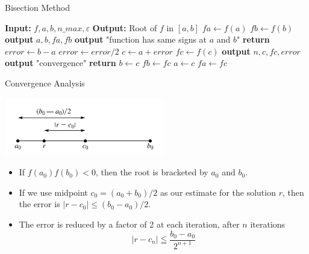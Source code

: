 \documentclass{beamer}
\begin{document}
\begin{frame}[fragile]{Bisection Method}
  \begin{multicols}{2}
  \scriptsize
    \begin{algorithmic}
      \State \textbf{Input:} $f, a, b, n\_max, \varepsilon$
      \State \textbf{Output:} Root of $f$ in $[a, b]$
      \State $fa \gets f(a)$
      \State $fb \gets f(b)$
        \State \textbf{output} $a, b, fa, fb$
        \State \textbf{output} "function has same signs at $a$ and $b$"
        \State \textbf{return}
      \EndIf
      \State $error \gets b - a$
        \State $error \gets error / 2$
        \State $c \gets a + error$
        \State $fc \gets f(c)$
        \State \textbf{output} $n, c, fc, error$
          \State \textbf{output} "convergence"
          \State \textbf{return}
        \EndIf
          \State $b \gets c$
          \State $fb \gets fc$
        \Else
          \State $a \gets c$
          \State $fa \gets fc$
        \EndIf
      \EndFor
    \EndProcedure
    \end{algorithmic}
  \end{multicols}
\end{frame}
\begin{frame}{Convergence Analysis}
  \centerline{ \includegraphics[height=1in]{Lec11_fig4.pdf}}
  \begin{itemize}
  \item If $f(a_0) f(b_0)<0$, then the root is bracketed by $a_0$ and $b_0$.
  \item If we use midpoint $c_0=(a_0+b_0)/2$ as our estimate for the solution $r$, then the error is $|r-c_0| \leq (b_0-a_0)/2$.
  \item  The error is reduced by a factor of 2 at each iteration, after $n$ iterations
  \[\left|r-c_n\right| \leqq \frac{b_0-a_0}{2^{n+1}} \]
  \end{itemize}
\end{frame}
\end{document}
